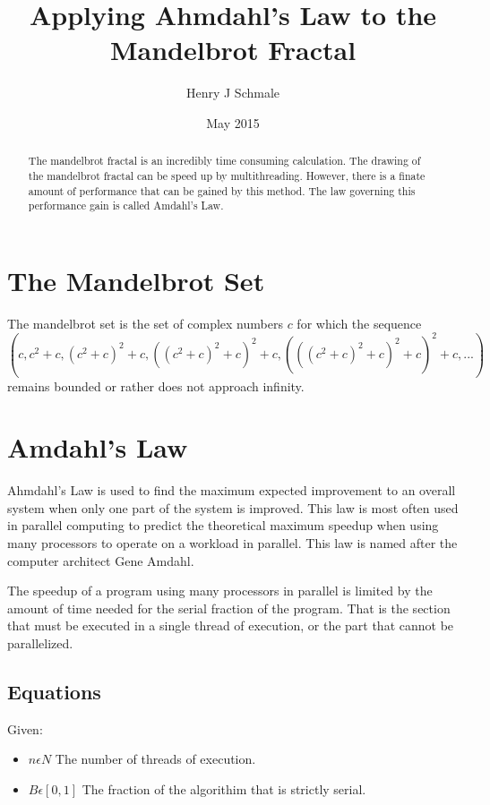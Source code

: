 \documentclass[10pt,oneside,letter]{article}
\begin{document}
\title{Applying Ahmdahl's Law to the Mandelbrot Fractal}
\author{Henry J Schmale}
\date{May 2015}
\maketitle

\begin{abstract}
The mandelbrot fractal is an incredibly time consuming calculation.
The drawing of the mandelbrot fractal can be speed up by multithreading.
However, there is a finate amount of performance that can be gained by
this method. The law governing this performance gain is called Amdahl's
Law.
\end{abstract}

\section{The Mandelbrot Set}
The mandelbrot set is the set of complex numbers $c$ for which the sequence
$(c, c^2 + c, (c^2+c)^2 + c, ((c^2+c)^2+c)^2 + c, (((c^2+c)^2+c)^2+c)^2 + c, ...)$
remains bounded or rather does not approach infinity.

\section{Amdahl's Law}
Ahmdahl's Law is used to find the maximum expected improvement to an overall
system when only one part of the system is improved. This law is most often
used in parallel computing to predict the theoretical maximum speedup when
using many processors to operate on a workload in parallel. This law is named
after the computer architect Gene Amdahl.

The speedup of a program using many processors in parallel is limited by the
amount of time needed for the serial fraction of the program. That is the
section that must be executed in a single thread of execution, or the part
that cannot be parallelized.

\subsection{Equations}
Given:
\begin{itemize}
  \item $n \epsilon N$ The number of threads of execution.
  \item $B \epsilon [0,1]$ The fraction of the algorithim that is
      strictly serial.
\end{itemize}
\end{document}
